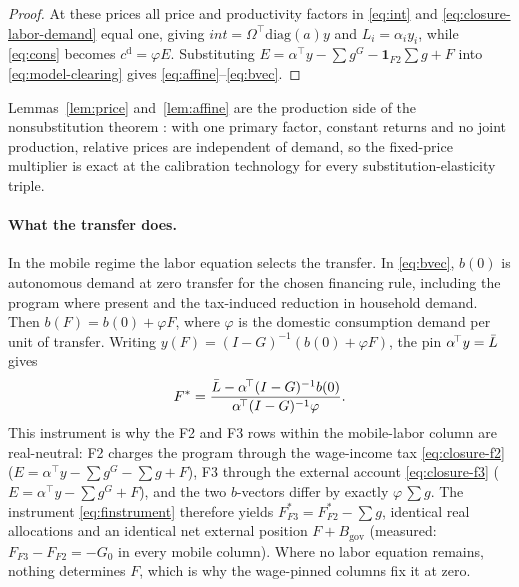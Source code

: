 \begin{proof}
At these prices all price and productivity factors in \eqref{eq:int} and
\eqref{eq:closure-labor-demand} equal one, giving
$int = \Omega^{\!\top}\mathrm{diag}(a)y$ and $L_i = \alpha_i y_i$,
while \eqref{eq:cons} becomes $c^{\mathrm{d}} = \varphi E$.
Substituting $E = \alpha^{\!\top}y - \sum g^G - \mathbf{1}_{F2}\sum g + F$
into \eqref{eq:model-clearing} gives \eqref{eq:affine}--\eqref{eq:bvec}.
\end{proof}

\begin{remark}[Nonsubstitution]\label{rem:samuelson}
Lemmas~\ref{lem:price} and~\ref{lem:affine} are the production side of the
nonsubstitution theorem \citep{Samuelson.1951}: with one primary factor,
constant returns and no joint production, relative prices are independent of
demand, so the fixed-price multiplier \citep{Robinson.2006} is exact at the
calibration technology for every substitution-elasticity triple.
\end{remark}

\paragraph{What the transfer does.} In the mobile regime the labor equation
selects the transfer. In \eqref{eq:bvec}, $b(0)$ is autonomous
demand at zero transfer for the chosen financing rule, including the program
where present and the tax-induced reduction in household demand. Then
$b(F) = b(0) + \varphi F$, where $\varphi$ is the domestic consumption demand
per unit of transfer. Writing $y(F) = (I-G)^{-1}(b(0) + \varphi F)$, the pin
$\alpha^{\!\top}y = \bar{L}$ gives
\begin{equation}
F^{\ast} = \frac{\bar{L} - \alpha^{\!\top}(I-G)^{-1} b(0)}
               {\alpha^{\!\top}(I-G)^{-1} \varphi}.
\label{eq:finstrument}
\end{equation}
This instrument is why the F2 and F3 rows within the mobile-labor column are real-neutral: F2
charges the program through the wage-income tax \eqref{eq:closure-f2} ($E = \alpha^{\!\top}y -
\sum g^G - \sum g + F$), F3 through the external account \eqref{eq:closure-f3} ($E = \alpha^{\!\top}y
- \sum g^G + F$), and the two $b$-vectors differ by exactly
$\varphi\,\sum g$. The instrument \eqref{eq:finstrument} therefore yields
$F^{\ast}_{F3} = F^{\ast}_{F2} - \sum g$, identical real allocations and an
identical net external position $F + B_{\mathrm{gov}}$ (measured:
$F_{F3} - F_{F2} = -G_0$ in every mobile column). Where no labor equation remains,
nothing determines $F$, which is why the wage-pinned columns fix it at zero.

